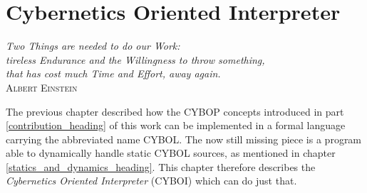 %
%
%
%
%
%
%

\chapter{Cybernetics Oriented Interpreter}
\label{cybernetics_oriented_interpreter_heading}

\begin{flushright}
    \textsl{
        Two Things are needed to do our Work:\\
        tireless Endurance and the Willingness to throw something,\\
        that has cost much Time and Effort, away again.
    }\\
    \textsc{Albert Einstein}
\end{flushright}

The previous chapter described how the CYBOP concepts introduced in part
\ref{contribution_heading} of this work can be implemented in a formal language
carrying the abbreviated name CYBOL. The now still missing piece is a program
able to dynamically handle static CYBOL sources, as mentioned in chapter
\ref{statics_and_dynamics_heading}. This chapter therefore describes the
\emph{Cybernetics Oriented Interpreter} (CYBOI) \cite{cybop} which can do just
that.




